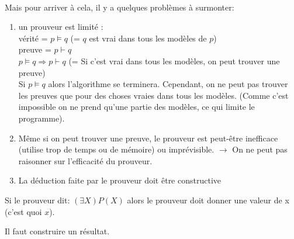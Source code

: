 \paragraph{}
Mais pour arriver à cela, il y a quelques problèmes à surmonter:
\begin{enumerate}\renewcommand {\theenumi }{\alph {enumi}}
	\item un prouveur est limité :\\
		vérité = $ p \models q $ (= $ q $ est vrai dans tous les modèles de $ p $)\\
		preuve = $ p  \vdash q $ \\
		$ p \models q \Rightarrow p \vdash q $ (= Si c’est vrai dans tous les modèles, on peut trouver une preuve)\\
		Si $ p \models q $ alors l’algorithme se terminera. Cependant, on ne peut pas trouver les preuves que pour des choses vraies dans tous les modèles. (Comme c’est impossible on ne prend qu’une partie des modèles, ce qui limite le programme).
		
		\item Même si on peut trouver une preuve, le prouveur est peut-être inefficace (utilise trop de temps ou de mémoire) ou imprévisible. $ \to $ On ne peut pas raisonner sur l’efficacité du prouveur.
		
		\item La déduction faite par le prouveur doit être constructive  
\end{enumerate}

		Si le prouveur dit: $ (\exists X) P(X) $  alors le prouveur doit donner une valeur de x (c’est quoi $ x $).



Il faut construire un résultat.

